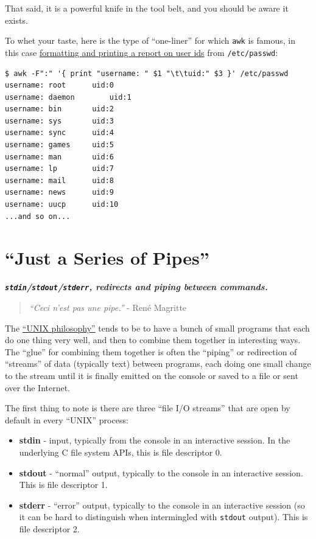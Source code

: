 \documentclass[10pt,]{book}
\numberwithin{figure}{chapter}
\begin{document}
That said, it is a powerful knife in the tool belt, and you should be
aware it exists.

To whet your taste, here is the type of ``one-liner'' for which
\texttt{awk} is famous, in this case
\href{http://www.ibm.com/developerworks/library/l-awk1/}{formatting and
printing a report on user ids} from \texttt{/etc/passwd}:

\begin{verbatim}
$ awk -F":" '{ print "username: " $1 "\t\tuid:" $3 }' /etc/passwd
username: root      uid:0
username: daemon        uid:1
username: bin       uid:2
username: sys       uid:3
username: sync      uid:4
username: games     uid:5
username: man       uid:6
username: lp        uid:7
username: mail      uid:8
username: news      uid:9
username: uucp      uid:10
...and so on...
\end{verbatim}

\chapter{``Just a Series of Pipes''}\label{just-a-series-of-pipes}

\textbf{\emph{\texttt{stdin}/\texttt{stdout}/\texttt{stderr}, redirects
and piping between commands.}}

\begin{quote}
\emph{``Ceci n'est pas une pipe.''} - René Magritte
\end{quote}

The \href{https://en.wikipedia.org/wiki/Unix_philosophy}{``UNIX
philosophy''} tends to be to have a bunch of small programs that each do
one thing very well, and then to combine them together in interesting
ways. The ``glue'' for combining them together is often the ``piping''
or redirection of ``streams'' of data (typically text) between programs,
each doing one small change to the stream until it is finally emitted on
the console or saved to a file or sent over the Internet.

The first thing to note is there are three ``file I/O streams'' that are
open by default in every ``UNIX'' process:

\begin{itemize}
\item
  \textbf{stdin} - input, typically from the console in an interactive
  session. In the underlying C file system APIs, this is file descriptor
  0.
\item
  \textbf{stdout} - ``normal'' output, typically to the console in an
  interactive session. This is file descriptor 1.
\item
  \textbf{stderr} - ``error'' output, typically to the console in an
  interactive session (so it can be hard to distinguish when
  intermingled with \texttt{stdout} output). This is file descriptor 2.
\end{itemize}
\end{document}

